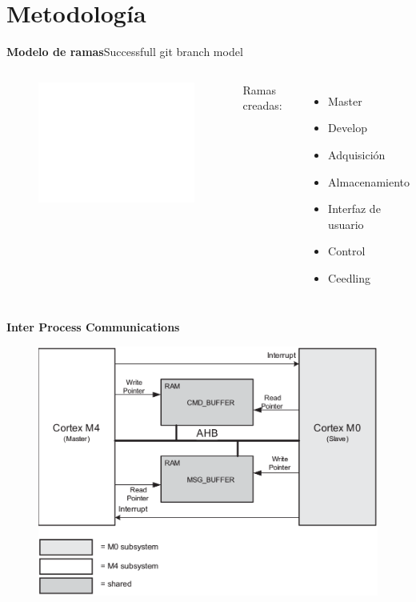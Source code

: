 \documentclass[11pt]{beamer}
\begin{document}
\section{Metodología}

\begin{frame}{\textbf{\LARGE{Modelo de ramas}}}{Successfull git branch model}
	\fontsize{16pt}{16}\selectfont
	\vspace{-.9cm}
	\begin{columns}
	  \begin{figure}[H]
    		\includegraphics<1->[height=.8\textheight]{./imagenes/Git-branching-model.pdf}
	  \end{figure}	
	\hfill
	Ramas creadas:
	\vspace{5px}
	  \begin{itemize}[]
		  \item Master
		  \item Develop
		  \item Adquisición
	  	  \item Almacenamiento
	  	  \item Interfaz de usuario
	 	  \item Control
	 	  \item Ceedling
	  \end{itemize}
	\end{columns}
\end{frame}


\begin{frame}{\textbf{\LARGE{Inter Process Communications}}}
	\vspace{-.7cm}
	\begin{figure}[H]
		\includegraphics[height=.8\textheight]{./imagenes/IPC.png}
	\end{figure}	
\end{frame}
\end{document}
